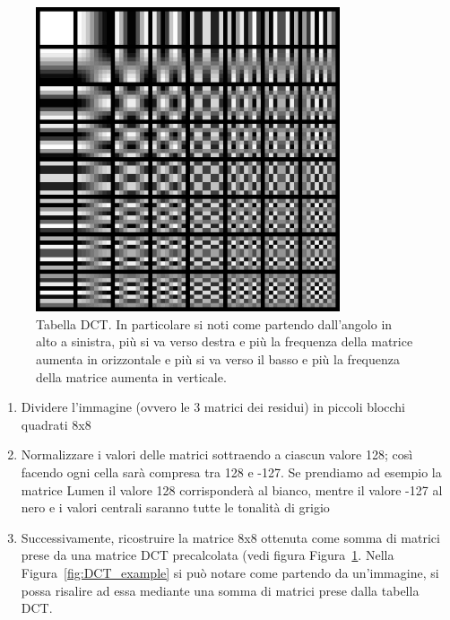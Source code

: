 \documentclass[a4paper,12pt, oneside]{article}
\begin{document}
\begin{figure}[h]
    \centering
    \includegraphics[width=0.8\textwidth]{images/DCT-table.png}
    \caption{Tabella DCT. In particolare si noti come partendo dall'angolo in alto a sinistra,
    più si va verso destra e più la frequenza della matrice aumenta in orizzontale e più si va
    verso il basso e più la frequenza della matrice aumenta in verticale.}
    \label{fig:DCT_table}
\end{figure}

\begin{enumerate}
    \item Dividere l'immagine (ovvero le 3 matrici dei residui) in piccoli blocchi quadrati 8x8
    \item Normalizzare i valori delle matrici sottraendo a ciascun valore 128; così facendo
    ogni cella sarà compresa tra 128 e -127. Se prendiamo ad esempio la matrice Lumen il valore
    128 corrisponderà al bianco, mentre il valore -127 al nero e i valori centrali saranno tutte
    le tonalità di grigio
    \item Successivamente, ricostruire la matrice 8x8 ottenuta come somma di matrici
    prese da una matrice DCT precalcolata (vedi figura Figura~\ref{fig:DCT_table}. Nella 
    Figura~\ref{fig:DCT_example} si può notare come partendo da un'immagine, si possa
    risalire ad essa mediante una somma di matrici prese dalla tabella DCT.
\end{enumerate}
\end{document}
